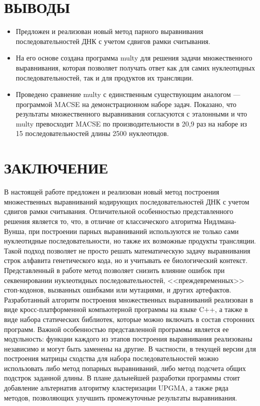 \newpage
\part*{\large \centering ВЫВОДЫ}
\begin{itemize}
\item Предложен и реализован новый метод парного выравнивания последовательностей ДНК с учетом сдвигов рамки считывания.
\item На его основе создана программа multy для решения задачи множественного выравнивания, которая позволяет получать ответ как для самих нуклеотидных последовательностей, так и для продуктов их трансляции.
\item Проведено сравнение multy с единственным существующим аналогом --- программой MACSE на демонстрационном наборе задач. Показано, что результаты множественного выравнивания согласуются с эталонными и что multy превосходит MACSE по производительности в 20,9 раз на наборе из 15 последовательностей длины 2500 нуклеотидов.
\end{itemize}   

\newpage
\part*{\large \centering ЗАКЛЮЧЕНИЕ}
\hspace{\parindent}В настоящей работе предложен и реализован новый метод построения множественных выравниваний кодирующих последовательностей ДНК с учетом сдвигов рамки считывания. Отличительной особенностью представленного решения является то, что, в отличие от классического алгоритма Нидлмана-Вунша, при построении парных выравниваний используются не только сами нуклеотидные последовательности, но также их возможные продукты трансляции. Такой подход позволяет не просто решать математическую задачу выравнивания строк алфавита генетического кода, но и учитывать ее биологический контекст. Представленный в работе метод позволяет снизить влияние ошибок при секвенировании нуклеотидных последовательностей, <<преждевременных>> стоп-кодонов, вызванных ошибками или мутациями, и других артефактов.\\
\indent Разработанный алгоритм построения множественных выравниваний реализован в виде кросс-платформенной компьютерной программы на языке C++, а также в виде набора статических библиотек, которые можно включать в состав сторонних программ. Важной особенностью представленной программы является ее модульность: функции каждого из этапов построения выравнивания реализованы независимо и могут быть заменены на другие. В частности, в текущей версии для построения матрицы сходства для набора последовательностей можно использовать либо метод попарных выравниваний, либо метод подсчета общих подстрок заданной длины. В плане дальнейшей разработки программы стоит добавление альтернатив алгоритму кластеризации UPGMA, а также ряда методов, позволяющих улучшить промежуточные результаты выравнивания.

